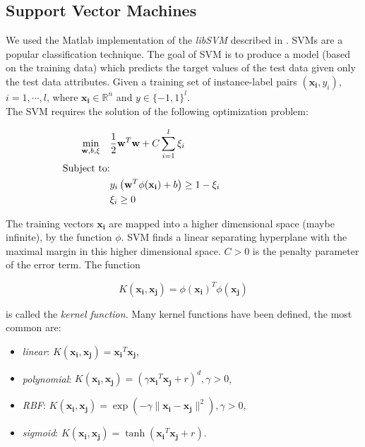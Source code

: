 \vspace{0.5cm}

\subsection{Support Vector Machines}
\label{ch4:svm}

We used the Matlab implementation of the \textit{libSVM} described in \cite{SVM01}. \Glspl{SVM} are a popular classification technique.
The goal of \Gls{SVM} is to produce a model (based on the training data) which predicts the target values of the test data
given only the test data attributes. Given a training set of instance-label pairs $(\mathbf{x_i}, y_i)$, $i = 1,\cdots,l$, where $\mathbf{x_i} \in \mathbb{R}^n$ and $y \in \{-1,1\}^l$.\\
The \Gls{SVM} requires the solution of the following optimization problem:

\begin{equation}
     \begin{aligned}
      \smash{\min_{\textbf{w},b,\xi}} \quad & \frac{1}{2}\textbf{w}^T\textbf{w}+C \sum_{i=1}^{l}\xi_i   \\
      \text{Subject to:} &\\
       & y_i \left(\textbf{w}^T \phi( \mathbf{x_i} ) +b\right) \geq 1-\xi_i \\
       & \xi_i \geq 0 
     \end{aligned}
     \phantom{\hspace{3cm}} %
\end{equation}

The training vectors $\mathbf{x_i}$ are mapped into a higher dimensional space (maybe infinite), by the function $\phi$.
\Gls{SVM} finds a linear separating hyperplane with the maximal margin in this higher dimensional space.
$C > 0$ is the penalty parameter of the error term.
The function

\begin{equation}
 K(\mathbf{x_i}, \mathbf{x_j}) = \phi(\mathbf{x_i})^T\phi(\mathbf{x_j})
\end{equation}

is called the \textit{kernel function}. Many kernel functions have been defined, the most common are:

\begin{itemize}
 \item \textit{linear}: $K(\mathbf{x_i}, \mathbf{x_j}) = \mathbf{x_i}^T\mathbf{x_j}$,
 \item \textit{polynomial}: $K(\mathbf{x_i}, \mathbf{x_j}) = \left(\gamma \mathbf{x_i}^T\mathbf{x_j} + r \right)^d, \gamma > 0$,
 \item \textit{\Gls{RBF}}: $K(\mathbf{x_i}, \mathbf{x_j}) = \exp{\left(-\gamma \lVert \mathbf{x_i} - \mathbf{x_j} \rVert^2 \right)}, \gamma > 0$,
 \item \textit{sigmoid}: $K(\mathbf{x_i}, \mathbf{x_j}) = \tanh \left( \mathbf{x_i}^T\mathbf{x_j} + r \right)$.
\end{itemize}

